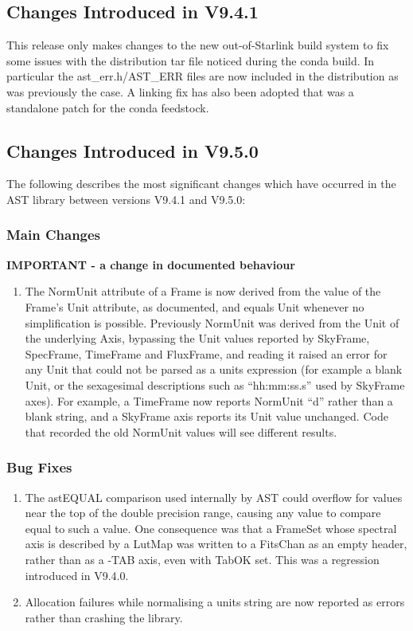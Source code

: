\documentclass[twoside,11pt]{starlink}
\begin{document}
\subsection{Changes Introduced in V9.4.1}

This release only makes changes to the new out-of-Starlink build system to fix some issues with the distribution tar file noticed during the conda build.
In particular the ast\_err.h/AST\_ERR files are now included in the distribution as was previously the case.
A linking fix has also been adopted that was a standalone patch for the
conda feedstock.

\subsection{Changes Introduced in V9.5.0}
The following describes the most significant changes which have
occurred in the AST library between versions V9.4.1 and V9.5.0:

\subsubsection{Main Changes}

\textbf{IMPORTANT - a change in documented behaviour}

\begin{enumerate}
\item The NormUnit attribute of a Frame is now derived from the value of the Frame's Unit attribute, as documented, and equals Unit whenever no simplification is possible.
  Previously NormUnit was derived from the Unit of the underlying Axis, bypassing the Unit values reported by SkyFrame, SpecFrame, TimeFrame and FluxFrame, and reading it raised an error for any Unit that could not be parsed as a units expression (for example a blank Unit, or the sexagesimal descriptions such as ``hh:mm:ss.s'' used by SkyFrame axes).
  For example, a TimeFrame now reports NormUnit ``d'' rather than a blank string, and a SkyFrame axis reports its Unit value unchanged.
  Code that recorded the old NormUnit values will see different results.
\end{enumerate}

\subsubsection{Bug Fixes}

\begin{enumerate}
\item The astEQUAL comparison used internally by AST could overflow for values near the top of the double precision range, causing any value to compare equal to such a value.
  One consequence was that a FrameSet whose spectral axis is described by a LutMap was written to a FitsChan as an empty header, rather than as a -TAB axis, even with TabOK set.
  This was a regression introduced in V9.4.0.
\item Allocation failures while normalising a units string are now reported as errors rather than crashing the library.
\end{enumerate}
\end{document}
